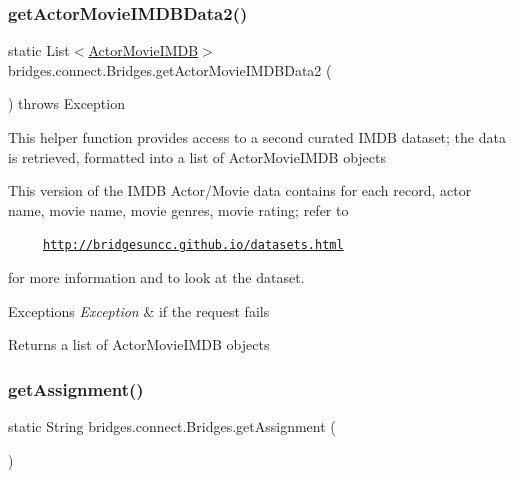 \subsubsection{\texorpdfstring{get\+Actor\+Movie\+I\+M\+D\+B\+Data2()}{getActorMovieIMDBData2()}}
{\footnotesize\ttfamily static List$<$\mbox{\hyperlink{classbridges_1_1data__src__dependent_1_1_actor_movie_i_m_d_b}{Actor\+Movie\+I\+M\+DB}}$>$ bridges.\+connect.\+Bridges.\+get\+Actor\+Movie\+I\+M\+D\+B\+Data2 (\begin{DoxyParamCaption}{ }\end{DoxyParamCaption}) throws Exception\hspace{0.3cm}{\ttfamily [static]}}

This helper function provides access to a second curated I\+M\+DB dataset; the data is retrieved, formatted into a list of Actor\+Movie\+I\+M\+DB objects

This version of the I\+M\+DB Actor/\+Movie data contains for each record, actor name, movie name, movie genres, movie rating; refer to 

~~~~~\href{http://bridgesuncc.github.io/datasets.html}{\tt http\+://bridgesuncc.\+github.\+io/datasets.\+html} 

for more information and to look at the dataset.


\begin{DoxyExceptions}{Exceptions}
{\em Exception} & if the request fails\\
\hline
\end{DoxyExceptions}
\begin{DoxyReturn}{Returns}
a list of Actor\+Movie\+I\+M\+DB objects 
\end{DoxyReturn}
\mbox{\label{classbridges_1_1connect_1_1_bridges_af049c06c532987eb616156fb16ea2f43}} 
\subsubsection{\texorpdfstring{get\+Assignment()}{getAssignment()}}
{\footnotesize\ttfamily static String bridges.\+connect.\+Bridges.\+get\+Assignment (\begin{DoxyParamCaption}{ }\end{DoxyParamCaption})\hspace{0.3cm}{\ttfamily [static]}}

